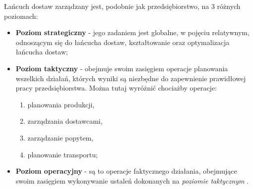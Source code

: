 		Łańcuch dostaw zarządzany jest, podobnie jak przedsiębiorstwo, na 3 różnych poziomach:
		\begin{itemize}
			\item \textbf{Poziom strategiczny} 	- jego zadaniem jest globalne,
			w pojęciu relatywnym, odnoszącym się do łańcucha dostaw, kształtowanie oraz optymalizacja
			łańcucha dostaw;
			\item \textbf{Poziom taktyczny}		- obejmuje swoim zasięgiem operacje planowania wszelkich działań, 
			których	wyniki są niezbędne do zapewnienie prawidłowej pracy przedsiębiorstwa. Można tutaj wyróżnić 
			chociażby operacje:
			\begin{enumerate}
				\item planowania produkcji,
				\item zarządzania dostawcami,
				\item zarządzanie popytem,
				\item planowanie transportu;
			\end{enumerate}
			\item \textbf{Poziom operacyjny} 	- są to operacje faktycznego działania, obejmujące swoim zasięgiem
			wykonywanie ustaleń dokonanych na \emph{poziomie taktycznym} \cite{ewolucja_lancuchow_dostaw_cz1}.
		\end{itemize}